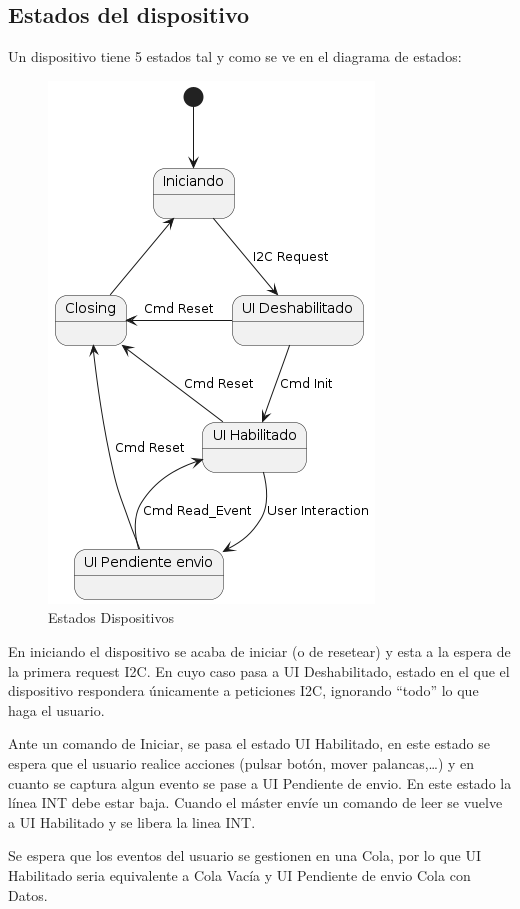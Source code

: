 \subsection{Estados del dispositivo}
Un dispositivo tiene 5 estados tal y como se ve en el diagrama de estados:
\begin{figure}[H]
    \centering{}
    \includegraphics[scale=0.8]{images/states.png}
    \caption{Estados Dispositivos}
    \label{fig:deviceStates}
\end{figure}
En iniciando el dispositivo se acaba de iniciar (o de resetear) y esta a la espera de la primera request I2C.
En cuyo caso pasa a UI Deshabilitado, estado en el que el dispositivo respondera únicamente a peticiones I2C,
ignorando “todo” lo que haga el usuario.

Ante un comando de Iniciar, se pasa el estado UI Habilitado, en este estado se espera que el usuario realice
acciones (pulsar botón, mover palancas,…) y en cuanto se captura algun evento se pase a UI Pendiente de envio.
En este estado la línea INT debe estar baja. Cuando el máster envíe un comando de leer se vuelve a UI Habilitado
y se libera la linea INT.

Se espera que los eventos del usuario se gestionen en una Cola, por lo que UI Habilitado seria equivalente a
Cola Vacía  y UI Pendiente de envio Cola con Datos.

